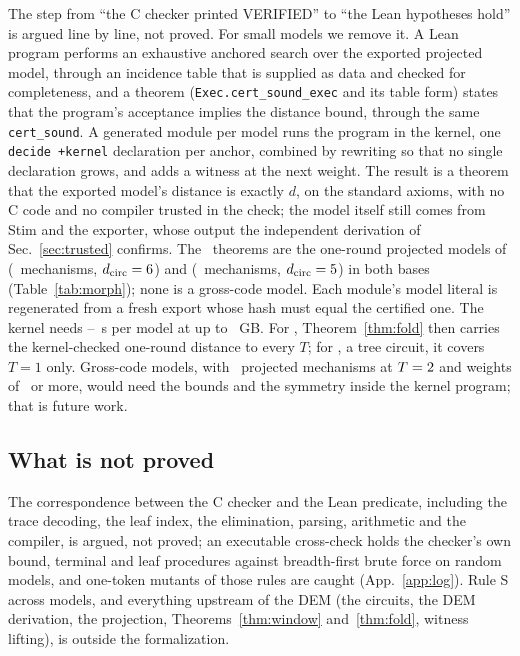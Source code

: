 \documentclass[aps,pra,twocolumn,superscriptaddress,nofootinbib,longbibliography,floatfix]{revtex4-2}
\newcommand{\dc}{d_{\mathrm{circ}}}
\begin{document}
The step from ``the C checker printed VERIFIED'' to ``the Lean hypotheses hold'' is argued line by line, not proved. For small models we remove it. A Lean program performs an exhaustive anchored search over the exported projected model, through an incidence table that is supplied as data and checked for completeness, and a theorem (\texttt{Exec.cert\_sound\_exec} and its table form) states that the program's acceptance implies the distance bound, through the same \texttt{cert\_sound}. A generated module per model runs the program in the kernel, one \texttt{decide +kernel} declaration per anchor, combined by rewriting so that no single declaration grows, and adds a witness at the next weight. The result is a theorem that the exported model's distance is exactly $d$, on the standard axioms, with no C code and no compiler trusted in the check; the model itself still comes from Stim and the exporter, whose output the independent derivation of Sec.~\ref{sec:trusted} confirms. The \LeanKernel\ theorems are the one-round projected models of \texttt{\KernelA} (\KernelMechA\ mechanisms, $\dc=\KernelDA$) and \texttt{\KernelB} (\KernelMechB\ mechanisms, $\dc=\KernelDB$) in both bases (Table~\ref{tab:morph}); none is a gross-code model. Each module's model literal is regenerated from a fresh export whose hash must equal the certified one. The kernel needs \KernelSLo--\KernelSHi~s per model at up to \KernelGB~GB. For \texttt{\KernelA}, Theorem~\ref{thm:fold} then carries the kernel-checked one-round distance to every $T$; for \texttt{\KernelB}, a tree circuit, it covers $T=1$ only. Gross-code models, with \IbmProjMech\ projected mechanisms at $T=2$ and weights of \IbmW\ or more, would need the bounds and the symmetry inside the kernel program; that is future work.

\subsection{What is not proved}

The correspondence between the C checker and the Lean predicate, including the trace decoding, the leaf index, the elimination, parsing, arithmetic and the compiler, is argued, not proved; an executable cross-check holds the checker's own bound, terminal and leaf procedures against breadth-first brute force on random models, and one-token mutants of those rules are caught (App.~\ref{app:log}). Rule S across models, and everything upstream of the DEM (the circuits, the DEM derivation, the projection, Theorems~\ref{thm:window} and~\ref{thm:fold}, witness lifting), is outside the formalization.
\end{document}
